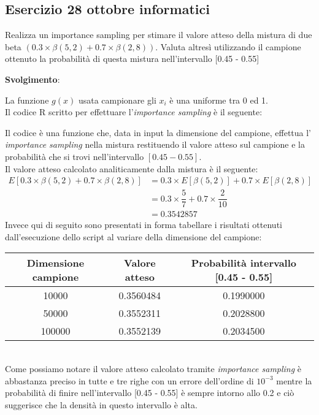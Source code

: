 \subsection{Esercizio 28 ottobre informatici}
Realizza un importance sampling per stimare il valore atteso della mistura di due beta $(0.3 \times \beta(5,2) + 0.7 \times \beta(2,8))$. Valuta altres\`i utilizzando il campione ottenuto la probabilit\`a di questa mistura nell'intervallo [0.45 - 0.55]

\textbf{Svolgimento}:
\bigskip

La funzione $g(x)$ usata campionare gli $x_i$ \`e una uniforme tra 0 ed 1.\\
Il codice R scritto per effettuare l'\textit{importance sampling} \`e il seguente:



Il codice \`e una funzione che, data in input la dimensione del campione, effettua l' \textit{importance sampling} nella mistura restituendo il valore atteso sul campione e la probabilit\`a che si trovi nell'intervallo $[0.45 - 0.55]$.\\
Il valore atteso calcolato analiticamente dalla mistura \`e il seguente:
\begin{align*}
E [ 0.3 \times \beta (5,2) + 0.7 \times \beta (2,8) ] &=  	0.3 \times E [ \beta (5,2) ] + 0.7 \times E[\beta(2,8)] \\
&=  0.3 \times \dfrac{5}{7} + 0.7 \times \dfrac{2}{10} \\
&=  0.3542857 
\end{align*}
Invece qui di seguito sono presentati in forma tabellare i risultati ottenuti dall'esecuzione dello script al variare della dimensione del campione: \medskip \\
\begin{tabular}{|c|c|c|}
	\hline 
	Dimensione campione & Valore atteso & Probabilit\`a intervallo [0.45 - 0.55] \\ 
	\hline 
	10000 & 0.3560484 & 0.1990000 \\ 
	\hline 
	50000 & 0.3552311 & 0.2028800 \\ 
	\hline 
	100000 & 0.3552139 & 0.2034500 \\ 
	\hline 
\end{tabular} \medskip\\
Come possiamo notare il valore atteso calcolato tramite \textit{importance sampling} \`e abbastanza preciso in tutte e tre righe con un errore dell'ordine di $10^{-3}$ mentre la probabilit\`a di finire nell'intervallo [0.45 - 0.55] \`e sempre intorno allo 0.2 e ci\`o suggerisce che la densit\`a in questo intervallo \`e alta.